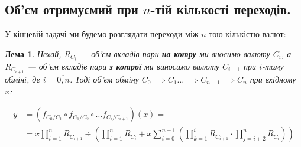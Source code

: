 \documentclass[14pt]{extarticle}
\newtheorem{lemma}{Лема}
\begin{document}
\subsection{Об'єм отримуємий при \(n\)-тій кількості переходів.}

У кінцевій задачі ми будемо розглядати переходи між \(n\)-тою кількістю валют:

\begin{lemma} Нехай, \(R_{C_{i}}\) --- об'єм вкладів пари \textbf{на котру} ми
  вносимо валюту \(C_i\), а \(R_{C_{i+1}}\) --- об'єм вкладів пари \textbf{з
	котрої} ми виносимо валюту \(C_{i+1}\) при \(i\)-тому обміні, де
  \(i = \overline{0, n}\). Тоді об'єм обміну
  \(C_{0} \implies C_{1} \ldots \implies C_{n-1} \implies C_{n} \) при вхідному
  \(x\):

  \begin{equation}\label{eq:nth-swap}
	\begin{aligned}
	  y &= (f_{C_{0}/C_{1}} \circ f_{C_{1}/C_{2}} \circ \ldots f_{C_{i}/C_{i+1}})(x) = \\
	  &= x \prod_{i=1}^n R_{C_{i+1}} \div \left( \prod_{i=1}^{n} R_{C_{i}} + x \sum_{i=0}^{n-1} \left( \prod_{k=1}^i R_{C_{i+1}} \cdot \prod_{j=i+2}^{n}  R_{C_{i}} \right) \right)
	\end{aligned}
	\end{equation}
\end{lemma}
\end{document}
